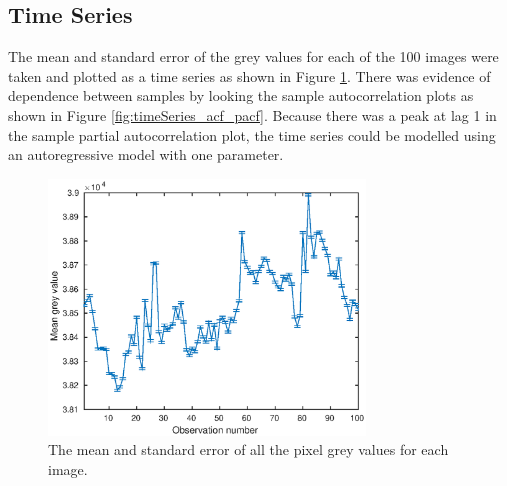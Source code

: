 \documentclass[12pt]{report}
\begin{document}
\subsection{Time Series}
The mean and standard error of the grey values for each of the 100 images were taken and plotted as a time series as shown in Figure \ref{fig:timeSeries}. There was evidence of dependence between samples by looking the sample autocorrelation plots as shown in Figure \ref{fig:timeSeries_acf_pacf}. Because there was a peak at lag 1 in the sample partial autocorrelation plot, the time series could be modelled using an autoregressive model with one parameter.

\begin{figure}
	\centering
	\includegraphics[width=0.75\textwidth]{figures/initial_timeSeries.eps}
	\caption{The mean and standard error of all the pixel grey values for each image.}
	\label{fig:timeSeries}
\end{figure}
\end{document}
